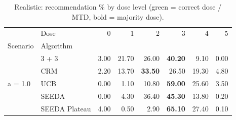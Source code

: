\begin{table}[H]
\centering
\caption{Realistic: recommendation \% by dose level (green = correct dose / MTD, bold = majority dose).}
\label{tab:real_rec_by_dose}
\begin{tabular}{llrrrrrr}
\toprule
 & Dose & 0 & 1 & 2 & 3 & 4 & 5 \\
Scenario & Algorithm &  &  &  &  &  &  \\
\midrule
\multirow[c]{5}{*}{a = 1.0} & 3 + 3 & 3.00 & 21.70 & {\cellcolor[HTML]{C8E6C9}} 26.00 & \bfseries 40.20 & 9.10 & 0.00 \\
 & CRM & 2.20 & 13.70 & {\cellcolor[HTML]{C8E6C9}} \bfseries 33.50 & 26.50 & 19.30 & 4.80 \\
 & UCB & 0.00 & 1.10 & {\cellcolor[HTML]{C8E6C9}} 10.80 & \bfseries 59.00 & 25.60 & 3.50 \\
 & SEEDA & 0.00 & 4.30 & {\cellcolor[HTML]{C8E6C9}} 36.40 & \bfseries 45.30 & 13.80 & 0.20 \\
 & SEEDA Plateau & 4.00 & 0.50 & {\cellcolor[HTML]{C8E6C9}} 2.90 & \bfseries 65.10 & 27.40 & 0.10 \\
\bottomrule
\end{tabular}
\end{table}
